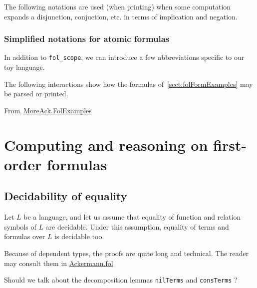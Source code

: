 
The following notations are used (when printing) when  some computation 
    expands a disjunction, conjuction, etc. 
    in terms of implication and negation.


\subsubsection{Simplified notations for atomic formulas}
\label{sec:fol-atomic-notations}

In addition to \texttt{fol\_scope}, we can introduce a few abbreviations specific to our toy language.


The following interactions show how the formulas 
of~\ref{sect:folFormExamples} may be 
parsed or printed. 

\noindent From~\href{../theories/html/hydras.MoreAck.FolExamples.html}{MoreAck.FolExamples}

\vspace{6pt}





\section{Computing and reasoning on first-order formulas}



\subsection{Decidability of equality}
Let $L$ be a language, and let us assume that equality 
of function and relation symbols of $L$ are decidable.
Under this assumption, equality of terms and formulas over $L$ is decidable too.

Because of dependent types, the proofs are quite long and technical. The reader may consult them in \href{../theories/html/hydras.Ackermann.fol.html}{Ackermann.fol}

\begin{todo}
  Should we talk about the decomposition lemmas
\texttt{nilTerms} and \texttt{consTerms} ?
\end{todo}


